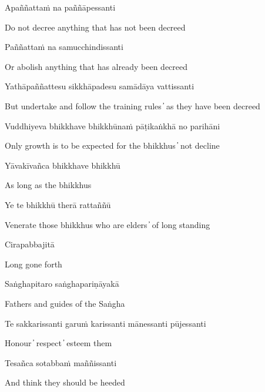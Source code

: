 Apaññattaṁ na paññāpessanti

\begin{cprenglish}
Do not decree anything that has not been decreed
\end{cprenglish}

Paññattaṁ na samucchindissanti

\begin{cprenglish}
Or abolish anything that has already been decreed
\end{cprenglish}

Yathāpaññattesu sikkhāpadesu samādāya vattissanti

\begin{cprenglish}
But undertake and follow the training rules  ̓  as they have been decreed
\end{cprenglish}

Vuddhiyeva bhikkhave bhikkhūnaṁ pāṭikaṅkhā no parihāni

\begin{cprenglish}
Only growth is to be expected for the bhikkhus  ̓  not decline
\end{cprenglish}

Yāvakīvañca bhikkhave bhikkhū

\begin{cprenglish}
As long as the bhikkhus
\end{cprenglish}

Ye te bhikkhū therā rattaññū

\begin{cprenglish}
Venerate those bhikkhus who are elders  ̓  of long standing
\end{cprenglish}

Cirapabbajitā

\begin{cprenglish}
Long gone forth
\end{cprenglish}

Saṅghapitaro saṅghapariṇāyakā

\begin{cprenglish}
Fathers and guides of the Saṅgha
\end{cprenglish}

Te sakkarissanti garuṁ karissanti mānessanti pūjessanti

\begin{cprenglish}
Honour  ̓  respect  ̓  esteem them
\end{cprenglish}

Tesañca sotabbaṁ maññissanti

\begin{cprenglish}
And think they should be heeded
\end{cprenglish}

